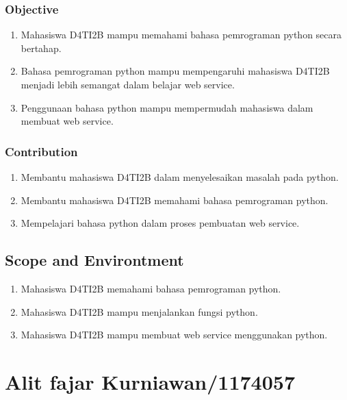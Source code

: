\subsubsection{Objective}
\begin{enumerate}
	\item Mahasiswa D4TI2B mampu memahami bahasa pemrograman python secara bertahap.
	\item Bahasa pemrograman python mampu mempengaruhi mahasiswa D4TI2B menjadi lebih semangat dalam belajar web service.
	\item Penggunaan bahasa python mampu mempermudah mahasiswa dalam membuat web service.
\end{enumerate}
\subsubsection{Contribution}
\begin{enumerate}
	\item Membantu mahasiswa D4TI2B dalam menyelesaikan masalah pada python.
	\item Membantu mahasiswa D4TI2B memahami bahasa pemrograman python.
	\item Mempelajari bahasa python dalam proses pembuatan web service.
\end{enumerate}
		
\subsection{Scope and Environtment}
\begin{enumerate}
	\item Mahasiswa D4TI2B memahami bahasa pemrograman python.
	\item Mahasiswa D4TI2B mampu menjalankan fungsi python.
	\item Mahasiswa D4TI2B mampu membuat web service menggunakan python.
\end{enumerate}

\section{Alit fajar Kurniawan/1174057}

